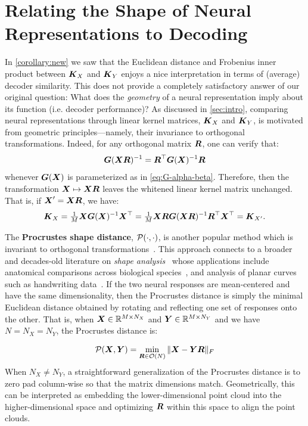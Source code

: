 \section{Relating the Shape of Neural Representations to Decoding}
\label{sec:shape-distance-connection}



In \cref{corollary:new} we saw that the Euclidean distance and Frobenius inner product between $\boldsymbol{K}_X$ and $\boldsymbol{K}_Y$ enjoys a nice interpretation in terms of (average) decoder similarity.
This does not provide a completely satisfactory answer of our original question: What does the \textit{geometry} of a neural representation imply about its function (i.e. decoder performance)?
As discussed in \cref{sec:intro}, comparing neural representations through linear kernel matrices, $\boldsymbol{K}_X$ and $\boldsymbol{K}_Y$, is motivated from geometric principles---namely, their invariance to orthogonal transformations.
Indeed, for any orthogonal matrix $\boldsymbol{R}$, one can verify that:
\begin{equation}
\boldsymbol{G}(\boldsymbol{X} \boldsymbol{R})^{-1} = \boldsymbol{R}^\top \boldsymbol{G}(\boldsymbol{X})^{-1} \boldsymbol{R}
\end{equation}
whenever $\boldsymbol{G}(\boldsymbol{X})$ is parameterized as in \cref{eq:G-alpha-beta}.
Therefore, then the transformation $\boldsymbol{X} \mapsto \boldsymbol{X} \boldsymbol{R}$ leaves the whitened linear kernel matrix unchanged.
That is, if $\boldsymbol{X}^\prime = \boldsymbol{X} \boldsymbol{R}$, we have:
\begin{equation}
\boldsymbol{K}_X = \tfrac{1}{M}\boldsymbol{X} \boldsymbol{G}(\boldsymbol{X})^{-1} \boldsymbol{X}^\top = \tfrac{1}{M}\boldsymbol{X} \boldsymbol{R} \boldsymbol{G}(\boldsymbol{X} \boldsymbol{R})^{-1}  \boldsymbol{R}^\top \boldsymbol{X}^\top = \boldsymbol{K}_{X'}.
\end{equation}

The \textbf{Procrustes shape distance}, $\mathcal{P}(\cdot,\cdot)$, is another popular method which is invariant to orthogonal transformations~\cite{williams2021generalized,Ding2021}.
This approach connects to a broader and decades-old literature on \textit{shape analysis}~\cite{dryden2016statistical,kendall2009shape} whose applications include anatomical comparisons across biological species~\cite{Elewa2004-sb}, and analysis of planar curves such as handwriting data~\cite{Srivastava2016-yq}.
If the two neural responses are mean-centered and have the same dimensionality, then the Procrustes distance is simply the minimal Euclidean distance obtained by rotating and reflecting one set of responses onto the other.
That is, when $\boldsymbol{X} \in \mathbb{R}^{M \times N_X}$ and $\boldsymbol{Y} \in \mathbb{R}^{M \times N_Y}$ and we have $N = N_X = N_Y$, the Procrustes distance is:

\begin{equation}\label{eq:proc-dist-def}
\mathcal{P}(\boldsymbol{X}, \boldsymbol{Y}) = \min_{\boldsymbol{R} \in \mathcal{O}(N)} \Vert \boldsymbol{X} - \boldsymbol{Y} \boldsymbol{R} \Vert_F
\end{equation}
When $N_X \neq N_Y$, a straightforward generalization of the Procrustes distance is to zero pad column-wise so that the matrix dimensions match.
Geometrically, this can be interpreted as embedding the lower-dimensional point cloud into the higher-dimensional space and optimizing $\boldsymbol{R}$ within this space to align the point clouds.


